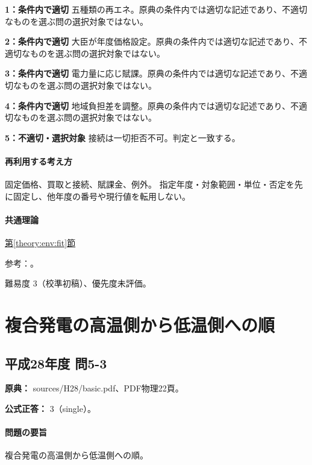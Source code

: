 \noindent\textbf{1：条件内で適切} 五種類の再エネ。原典の条件内では適切な記述であり、不適切なものを選ぶ問の選択対象ではない。\par

\noindent\textbf{2：条件内で適切} 大臣が年度価格設定。原典の条件内では適切な記述であり、不適切なものを選ぶ問の選択対象ではない。\par

\noindent\textbf{3：条件内で適切} 電力量に応じ賦課。原典の条件内では適切な記述であり、不適切なものを選ぶ問の選択対象ではない。\par

\noindent\textbf{4：条件内で適切} 地域負担差を調整。原典の条件内では適切な記述であり、不適切なものを選ぶ問の選択対象ではない。\par

\noindent\textbf{5：不適切・選択対象} 接続は一切拒否不可。判定と一致する。\par

\paragraph{再利用する考え方} 固定価格、買取と接続、賦課金、例外。 指定年度・対象範囲・単位・否定を先に固定し、他年度の番号や現行値を転用しない。

\paragraph{共通理論} \hyperref[theory:env:fit]{第\ref*{theory:env:fit}節}

\par 参考：\cite{env58_fit2013}。

\par 難易度 3（校準初稿）、優先度未評価。

\section{複合発電の高温側から低温側への順}

\subsection{平成28年度 問5-3}
\label{q:h28-reg-basic-5-3}

\noindent\textbf{原典：} sources/H28/basic.pdf、PDF物理22頁。

\textbf{公式正答：} 3（single）。

\paragraph{問題の要旨} 複合発電の高温側から低温側への順。

